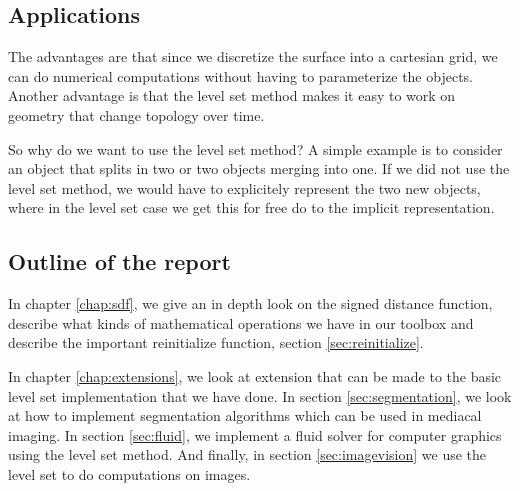 \subsection{Applications}

The advantages are that since we discretize the surface into a cartesian grid, we can do numerical computations without having to parameterize the objects. Another advantage is that the level set method makes it easy to work on geometry that change topology over time.


So why do we want to use the level set method? A simple example is to consider an object that splits in two or two objects merging into one. If we did not use the level set method, we would have to explicitely represent the two new objects, where in the level set case we get this for free do to the implicit representation.


\subsection{Outline of the report}

In chapter \vref{chap:sdf}, we give an in depth look on the signed distance function, describe what kinds of mathematical operations we have in our toolbox and describe the important reinitialize function, section \vref{sec:reinitialize}.

In chapter \vref{chap:extensions}, we look at extension that can be made to the basic level set implementation that we have done. In section \vref{sec:segmentation}, we look at how to implement segmentation algorithms which can be used in mediacal imaging. In section \vref{sec:fluid}, we implement a fluid solver for computer graphics using the level set method. And finally, in section \vref{sec:imagevision} we use the level set to do computations on images.





